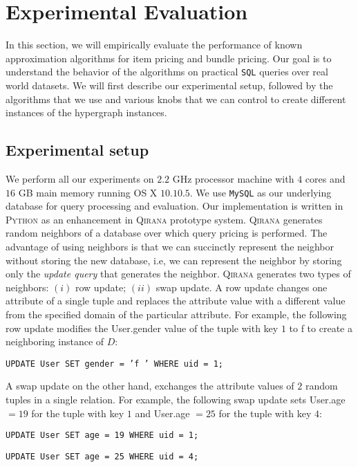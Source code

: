 \section{Experimental Evaluation}

In this section, we will empirically evaluate the performance of known approximation algorithms for item pricing and bundle pricing. Our goal is to understand the behavior of the algorithms on practical \texttt{SQL} queries over real world datasets. We will first describe our experimental setup, followed by the algorithms that we use and various knobs that we can control to create different instances of the hypergraph instances. 

\subsection{Experimental setup}

We perform all our experiments on $2.2$ GHz processor machine with $4$ cores and $16$ GB main memory running OS X $10.10.5$. We use \texttt{MySQL} as our underlying database for query processing and evaluation. Our implementation is written in \textsc{Python} as an enhancement in \textsc{Qirana} prototype system. \textsc{Qirana} generates random neighbors of a database over which query pricing is performed. The advantage of using neighbors is that we can succinctly represent the neighbor without storing the new database, i.e, we can represent the neighbor by storing only the \emph{update query} that generates the neighbor. \textsc{Qirana} generates two types of neighbors: $(i)$ row update; $(ii)$ swap update. A row update changes one attribute of a single tuple and replaces the attribute value with a different value from the specified domain of the particular attribute. For example,  the following row update modifies the \textsf{User.gender} value of the tuple with key $1$ to f to create a neighboring instance of $D$: 

\begin{center}
	\texttt{UPDATE User SET gender = ’f ’ WHERE uid = 1;}
\end{center}

A swap update on the other hand, exchanges the attribute values of $2$ random tuples in a single relation. For example, the following swap update sets
\textsf{User.age} $= 19$ for the tuple with key $1$ and \textsf{User.age} $= 25$ for
the tuple with key $4$:

\begin{center}
\texttt{UPDATE User SET age = 19 WHERE uid = 1;} 

\texttt{UPDATE User SET age = 25 WHERE uid = 4;}
\end{center}


